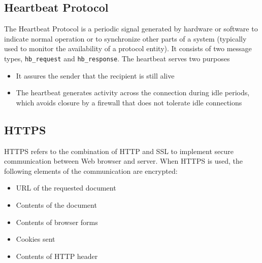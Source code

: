 \subsection{Heartbeat Protocol}
The Heartbeat Protocol is a periodic signal generated by hardware or software to indicate normal operation or to synchronize other parts of a system (typically used to monitor the availability of a protocol entity). It consists of two message types, \texttt{hb\_request} and \texttt{hb\_response}. The heartbeat serves two purposes
\begin{itemize}
    \item It assures the sender that the recipient is still alive
    \item The heartbeat generates activity across the connection during idle periods, which avoids closure by a firewall that does not tolerate idle connections
\end{itemize}
\subsection{HTTPS}
HTTPS refers to the combination of HTTP and SSL to implement secure communication between Web browser and server. When HTTPS is used, the following elements of the communication are encrypted:
\begin{itemize}
    \item URL of the requested document
    \item Contents of the document
    \item Contents of browser forms
    \item Cookies sent
    \item Contents of HTTP header
\end{itemize}